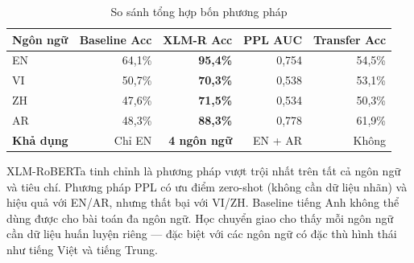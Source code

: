 \begin{table}[h]
\centering
\caption{So sánh tổng hợp bốn phương pháp}
\label{tab:comparison}
\begin{tabular}{lrrrr}
\toprule
\textbf{Ngôn ngữ} & \textbf{Baseline Acc} & \textbf{XLM-R Acc}
    & \textbf{PPL AUC} & \textbf{Transfer Acc} \\
\midrule
EN & 64,1\% & \textbf{95,4\%} & 0,754 & 54,5\% \\
VI & 50,7\% & \textbf{70,3\%} & 0,538 & 53,1\% \\
ZH & 47,6\% & \textbf{71,5\%} & 0,534 & 50,3\% \\
AR & 48,3\% & \textbf{88,3\%} & 0,778 & 61,9\% \\
\midrule
\textbf{Khả dụng} & Chỉ EN & \textbf{4 ngôn ngữ} & EN + AR & Không \\
\bottomrule
\end{tabular}
\end{table}

XLM-RoBERTa tinh chỉnh là phương pháp vượt trội nhất trên tất cả ngôn
ngữ và tiêu chí. Phương pháp PPL có ưu điểm zero-shot (không cần dữ
liệu nhãn) và hiệu quả với EN/AR, nhưng thất bại với VI/ZH. Baseline
tiếng Anh không thể dùng được cho bài toán đa ngôn ngữ. Học chuyển giao
cho thấy mỗi ngôn ngữ cần dữ liệu huấn luyện riêng --- đặc biệt với
các ngôn ngữ có đặc thù hình thái như tiếng Việt và tiếng Trung.
